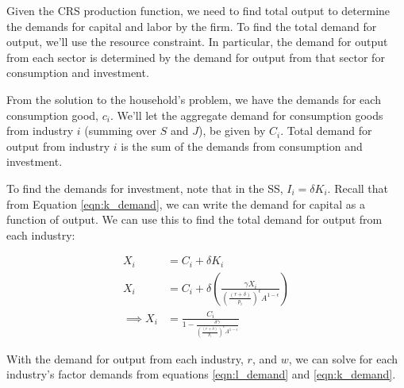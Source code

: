 \documentclass[letterpaper,12pt]{article}
\theoremstyle{definition}
\begin{document}
\begin{spacing}{1.5}
Given the CRS production function, we need to find total output to determine the demands for capital and labor by the firm.  To find the total demand for output, we'll use the resource constraint.  In particular, the demand for output from each sector is determined by the demand for output from that sector for consumption and investment.

From the solution to the household's problem, we have the demands for each consumption good, $c_{i}$.  We'll let the aggregate demand for consumption goods from industry $i$ (summing over $S$ and $J$), be given by $C_{i}$.  Total demand for output from industry $i$ is the sum of the demands from consumption and investment.

To find the demands for investment, note that in the SS, $I_{i}=\delta K_{i}$.  Recall that from Equation \ref{eqn:k_demand}, we can write the demand for capital as a function of output.  We can use this to find the total demand for output from each industry:

\begin{equation}
\label{eqn:find_output}
\begin{split}
X_{i} &= C_{i} + \delta K_{i} \\
X_{i} &= C_{i} + \delta \left(\frac{\gamma X_{i}}{\left(\frac{(r+\delta)}{p_{i}}\right)^{\epsilon}A^{1-\epsilon}} \right)\\
\implies X_{i} &= \frac{C_{i}}{1-\frac{\delta \gamma}{\left(\frac{(r+\delta)}{p_{i}}\right)^{\epsilon}A^{1-\epsilon}}}
\end{split}
\end{equation}  

With the demand for output from each industry, $r$, and $w$, we can solve for each industry's factor demands from equations \ref{eqn:l_demand} and \ref{eqn:k_demand}.


\end{spacing}
\end{document}
